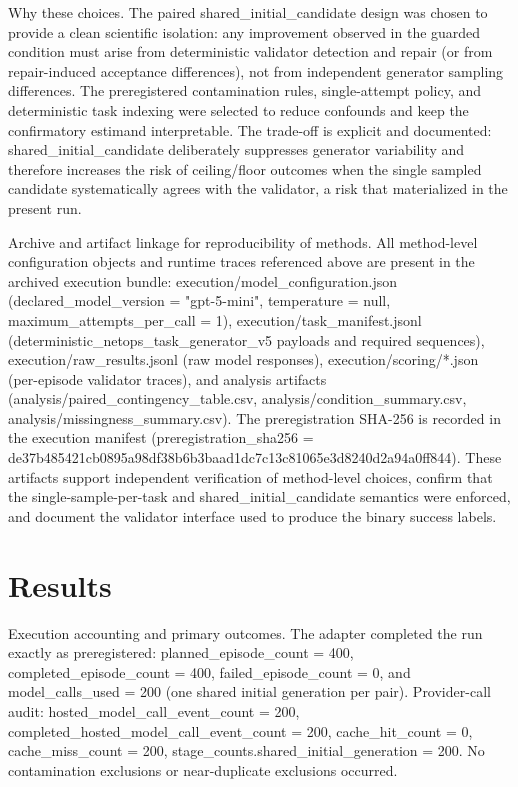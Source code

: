 \documentclass[conference]{IEEEtran}
\begin{document}
Why these choices. The paired shared\_initial\_candidate design was chosen to provide a clean scientific isolation: any improvement observed in the guarded condition must arise from deterministic validator detection and repair (or from repair-induced acceptance differences), not from independent generator sampling differences. The preregistered contamination rules, single-attempt policy, and deterministic task indexing were selected to reduce confounds and keep the confirmatory estimand interpretable. The trade-off is explicit and documented: shared\_initial\_candidate deliberately suppresses generator variability and therefore increases the risk of ceiling/floor outcomes when the single sampled candidate systematically agrees with the validator, a risk that materialized in the present run.

Archive and artifact linkage for reproducibility of methods. All method-level configuration objects and runtime traces referenced above are present in the archived execution bundle: execution/model\_configuration.json (declared\_model\_version = "gpt-5-mini", temperature = null, maximum\_attempts\_per\_call = 1), execution/task\_manifest.jsonl (deterministic\_netops\_task\_generator\_v5 payloads and required sequences), execution/raw\_results.jsonl (raw model responses), execution/scoring/*.json (per-episode validator traces), and analysis artifacts (analysis/paired\_contingency\_table.csv, analysis/condition\_summary.csv, analysis/missingness\_summary.csv). The preregistration SHA-256 is recorded in the execution manifest (preregistration\_sha256 = de37b485\allowbreak{}421cb089\allowbreak{}5a98df38\allowbreak{}b6b3baad\allowbreak{}1dc7c13c\allowbreak{}81065e3d\allowbreak{}8240d2a9\allowbreak{}4a0ff844). These artifacts support independent verification of method-level choices, confirm that the single-sample-per-task and shared\_initial\_candidate semantics were enforced, and document the validator interface used to produce the binary success labels.

\section{Results}
Execution accounting and primary outcomes. The adapter completed the run exactly as preregistered: planned\_episode\_count = 400, completed\_episode\_count = 400, failed\_episode\_count = 0, and model\_calls\_used = 200 (one shared initial generation per pair). Provider-call audit: hosted\_model\_call\_event\_count = 200, completed\_hosted\_model\_call\_event\_count = 200, cache\_hit\_count = 0, cache\_miss\_count = 200, stage\_counts.shared\_initial\_generation = 200. No contamination exclusions or near-duplicate exclusions occurred.
\end{document}
